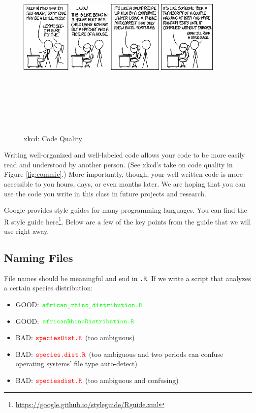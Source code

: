 \documentclass[]{krantz}
\providecommand{\tightlist}{%
  \setlength{\itemsep}{0pt}\setlength{\parskip}{0pt}}
\renewcommand{\href}[2]{#2\footnote{\url{#1}}}
\theoremstyle{definition}
\theoremstyle{definition}
\theoremstyle{definition}
\theoremstyle{remark}
\begin{document}
\begin{figure}
\includegraphics[width=4in,height=4in]{02-introToR/02-images/code_quality} \caption{xkcd: Code Quality}\label{fig:comic}
\end{figure}

Writing well-organized and well-labeled code allows your code to be more
easily read and understood by another person. (See xkcd's take on code
quality in Figure \ref{fig:commic}.) More importantly, though, your
well-written code is more accessible to you hours, days, or even months
later. We are hoping that you can use the code you write in this class
in future projects and research.

Google provides style guides for many programming languages. You can
find the R style guide
\href{https://google.github.io/styleguide/Rguide.xml}{here}. Below are a
few of the key points from the guide that we will use right away.

\subsection{Naming Files}\label{naming-files}

File names should be meaningful and end in \texttt{.R}. If we write a
script that analyzes a certain species distribution:

\begin{itemize}
\tightlist
\item
  GOOD: \(\color{green}{\verb+african_rhino_distribution.R+}\)
\item
  GOOD: \(\color{green}{\verb+africanRhinoDistribution.R+}\)
\item
  BAD: \(\color{red}{\verb+speciesDist.R+}\) (too ambiguous)
\item
  BAD: \(\color{red}{\verb+species.dist.R+}\) (too ambiguous and two
  periods can confuse operating systems' file type auto-detect)
\item
  BAD: \(\color{red}{\verb+speciesdist.R+}\) (too ambiguous and
  confusing)
\end{itemize}
\end{document}
